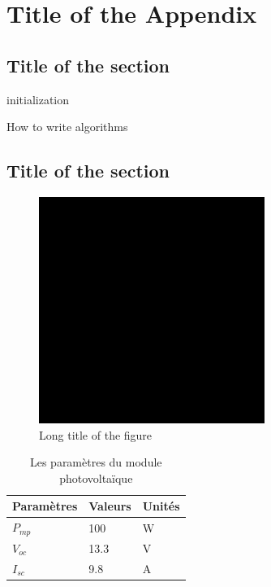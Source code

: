 \chapter{Title of the Appendix}
\section{Title of the section}
\begin{algorithm}[H]
	\SetAlgoLined
	initialization\;
	\caption{How to write algorithms}
\end{algorithm}
\section{Title of the section}
\begin{figure}[H]
	\centering
	\includegraphics[width=0.55\linewidth,scale=1.0]{5-Chapters/Chapter1/drawing.eps}
	\caption[Short title of the figure]{Long title of the figure\label{figLabel2}}
\end{figure}

\begin{table}[H]
	\centering
	\caption{Les paramètres du module photovoltaïque 
		\label{tabLabel2}}
	\begin{tabular}{@{\extracolsep{\fill}}lll@{}}
		\toprule
		Paramètres & Valeurs & Unités\\
		\midrule			
		$P_{mp}$& 100& \si{\watt}\\
		\midrule
		$V_{oc}$& 13.3& \si{\volt}\\
		\midrule
		$I_{sc}$& 9.8& \si{\ampere}\\							
		\bottomrule
	\end{tabular}
\end{table}